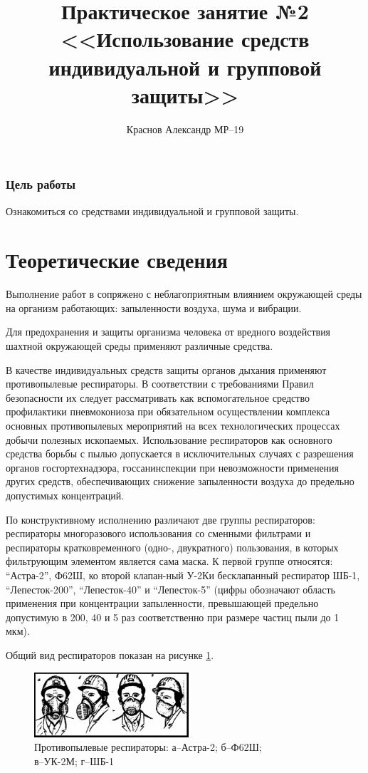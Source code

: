 \documentclass[a5paper, 12dd, twoside]{article}
\title{Практическое занятие №2\\<<Использование средств индивидуальной и групповой защиты>>}
\author{Краснов Александр МР--19}
\begin{document}
\maketitle
\tableofcontents
\clearpage

\subsubsection*{Цель работы}
Ознакомиться со средствами индивидуальной и групповой защиты.

\section{Теоретические сведения}
Выполнение работ в сопряжено с неблагоприятным влиянием окружающей среды на организм работающих: запыленности воздуха, шума и вибрации.

Для предохранения и защиты организма человека от вредного воздействия шахтной окружающей среды применяют различные средства.

В качестве индивидуальных средств защиты органов дыхания применяют противопылевые респираторы. В соответствии с требованиями Правил безопасности их следует рассматривать как вспомогательное средство профилактики пневмокониоза при обязательном осуществлении комплекса основных противопылевых мероприятий на всех технологических процессах добычи полезных ископаемых. Использование респираторов как основного средства борьбы с пылью допускается в исключительных случаях с разрешения органов госгортехнадзора, госсанинспекции при невозможности применения других средств, обеспечивающих снижение запыленности воздуха до предельно допустимых концентраций.

По конструктивному исполнению различают две группы респираторов: респираторы многоразового использования со сменными фильтрами и респираторы кратковременного (одно-, двукратного) пользования, в которых фильтрующим элементом является сама маска. К первой группе относятся: ``Астра-2'', Ф62Ш, ко второй клапан-ный У-2Ки бесклапанный респиратор ШБ-1, ``Лепесток-200'', ``Лепесток-40'' и ``Лепесток-5'' (цифры обозначают область применения при концентрации запыленности, превышающей предельно допустимую в 200, 40 и 5 раз соответственно при размере частиц пыли до 1 мкм).

Общий вид респираторов показан на рисунке \ref{fig}.

\begin{figure}[h]
    \centering
    \includegraphics[]{1.jpg}
    \caption{Противопылевые респираторы: а--Астра-2; б--Ф62Ш;\\ в--УК-2М; г--ШБ-1}
    \label{fig}
\end{figure}
\end{document}
